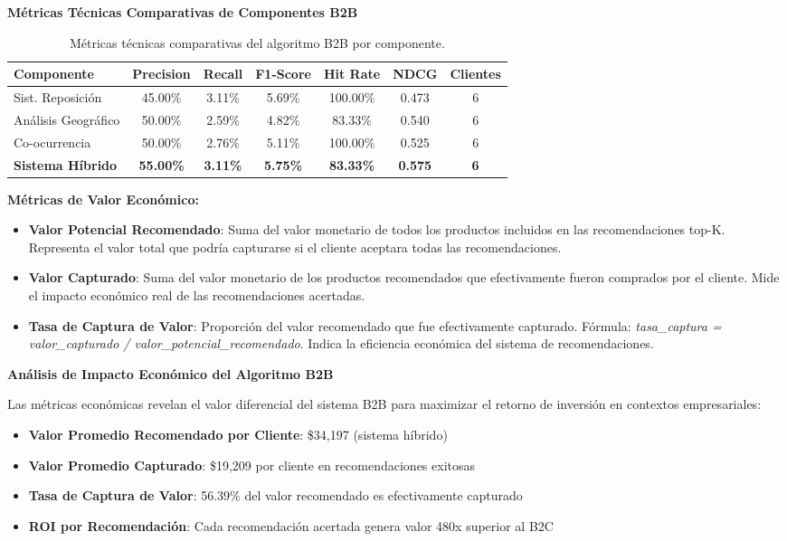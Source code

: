 \documentclass[twocolumn]{article}
\begin{document}
\textbf{Métricas Técnicas Comparativas de Componentes B2B}
\begin{table}[H]
\centering
\tiny
\setlength{\tabcolsep}{9pt}
\begin{tabular}{|l|c|c|c|c|c|c|}
\hline
\textbf{Componente} & \textbf{Precision} & \textbf{Recall} & \textbf{F1-Score} & \textbf{Hit Rate} & \textbf{NDCG} & \textbf{Clientes} \\
\hline
Sist. Reposición & 45.00\% & 3.11\% & 5.69\% & 100.00\% & 0.473 & 6 \\
\hline
Análisis Geográfico & 50.00\% & 2.59\% & 4.82\% & 83.33\% & 0.540 & 6 \\
\hline
Co-ocurrencia & 50.00\% & 2.76\% & 5.11\% & 100.00\% & 0.525 & 6 \\
\hline
\textbf{Sistema Híbrido} & \textbf{55.00\%} & \textbf{3.11\%} & \textbf{5.75\%} & \textbf{83.33\%} & \textbf{0.575} & \textbf{6} \\
\hline
\end{tabular}
\caption{Métricas técnicas comparativas del algoritmo B2B por componente.}
\end{table}
\textbf{Métricas de Valor Económico:}
\begin{itemize}
    \item \textbf{Valor Potencial Recomendado}: Suma del valor monetario de todos los productos incluidos en las recomendaciones top-K. Representa el valor total que podría capturarse si el cliente aceptara todas las recomendaciones.
    
    \item \textbf{Valor Capturado}: Suma del valor monetario de los productos recomendados que efectivamente fueron comprados por el cliente. Mide el impacto económico real de las recomendaciones acertadas.
    
    \item \textbf{Tasa de Captura de Valor}: Proporción del valor recomendado que fue efectivamente capturado. Fórmula: \textit{tasa\_captura = valor\_capturado / valor\_potencial\_recomendado}. Indica la eficiencia económica del sistema de recomendaciones.
\end{itemize}


\textbf{Análisis de Impacto Económico del Algoritmo B2B}

Las métricas económicas revelan el valor diferencial del sistema B2B para maximizar el retorno de inversión en contextos empresariales:

\begin{itemize}
    \item \textbf{Valor Promedio Recomendado por Cliente}: \$34,197 (sistema híbrido)
    \item \textbf{Valor Promedio Capturado}: \$19,209 por cliente en recomendaciones exitosas  
    \item \textbf{Tasa de Captura de Valor}: 56.39\% del valor recomendado es efectivamente capturado
    \item \textbf{ROI por Recomendación}: Cada recomendación acertada genera valor 480x superior al B2C
\end{itemize}
\end{document}
